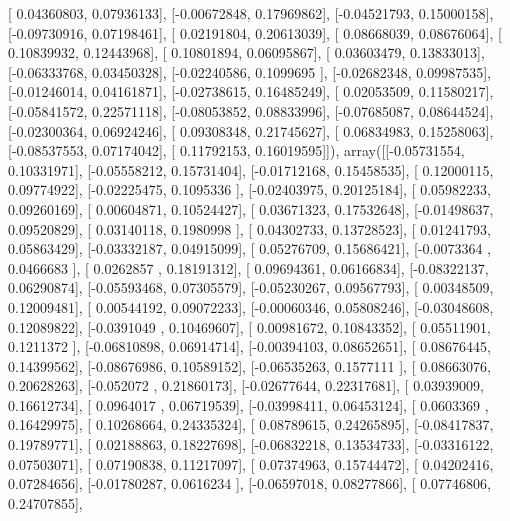 \documentclass{article}
\begin{document}
       [ 0.04360803,  0.07936133],
       [-0.00672848,  0.17969862],
       [-0.04521793,  0.15000158],
       [-0.09730916,  0.07198461],
       [ 0.02191804,  0.20613039],
       [ 0.08668039,  0.08676064],
       [ 0.10839932,  0.12443968],
       [ 0.10801894,  0.06095867],
       [ 0.03603479,  0.13833013],
       [-0.06333768,  0.03450328],
       [-0.02240586,  0.1099695 ],
       [-0.02682348,  0.09987535],
       [-0.01246014,  0.04161871],
       [-0.02738615,  0.16485249],
       [ 0.02053509,  0.11580217],
       [-0.05841572,  0.22571118],
       [-0.08053852,  0.08833996],
       [-0.07685087,  0.08644524],
       [-0.02300364,  0.06924246],
       [ 0.09308348,  0.21745627],
       [ 0.06834983,  0.15258063],
       [-0.08537553,  0.07174042],
       [ 0.11792153,  0.16019595]]), array([[-0.05731554,  0.10331971],
       [-0.05558212,  0.15731404],
       [-0.01712168,  0.15458535],
       [ 0.12000115,  0.09774922],
       [-0.02225475,  0.1095336 ],
       [-0.02403975,  0.20125184],
       [ 0.05982233,  0.09260169],
       [ 0.00604871,  0.10524427],
       [ 0.03671323,  0.17532648],
       [-0.01498637,  0.09520829],
       [ 0.03140118,  0.1980998 ],
       [ 0.04302733,  0.13728523],
       [ 0.01241793,  0.05863429],
       [-0.03332187,  0.04915099],
       [ 0.05276709,  0.15686421],
       [-0.0073364 ,  0.0466683 ],
       [ 0.0262857 ,  0.18191312],
       [ 0.09694361,  0.06166834],
       [-0.08322137,  0.06290874],
       [-0.05593468,  0.07305579],
       [-0.05230267,  0.09567793],
       [ 0.00348509,  0.12009481],
       [ 0.00544192,  0.09072233],
       [-0.00060346,  0.05808246],
       [-0.03048608,  0.12089822],
       [-0.0391049 ,  0.10469607],
       [ 0.00981672,  0.10843352],
       [ 0.05511901,  0.1211372 ],
       [-0.06810898,  0.06914714],
       [-0.00394103,  0.08652651],
       [ 0.08676445,  0.14399562],
       [-0.08676986,  0.10589152],
       [-0.06535263,  0.1577111 ],
       [ 0.08663076,  0.20628263],
       [-0.052072  ,  0.21860173],
       [-0.02677644,  0.22317681],
       [ 0.03939009,  0.16612734],
       [ 0.0964017 ,  0.06719539],
       [-0.03998411,  0.06453124],
       [ 0.0603369 ,  0.16429975],
       [ 0.10268664,  0.24335324],
       [ 0.08789615,  0.24265895],
       [-0.08417837,  0.19789771],
       [ 0.02188863,  0.18227698],
       [-0.06832218,  0.13534733],
       [-0.03316122,  0.07503071],
       [ 0.07190838,  0.11217097],
       [ 0.07374963,  0.15744472],
       [ 0.04202416,  0.07284656],
       [-0.01780287,  0.0616234 ],
       [-0.06597018,  0.08277866],
       [ 0.07746806,  0.24707855],
\end{document}
